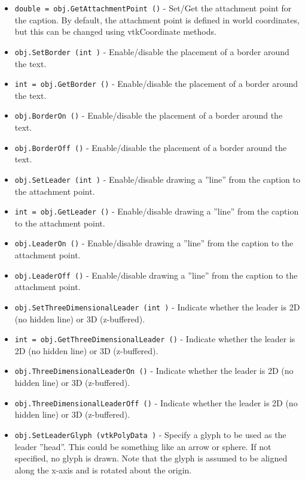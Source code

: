 \begin{itemize}
\item  \verb|double = obj.GetAttachmentPoint ()| -  Set/Get the attachment point for the caption. By default, the attachment
 point is defined in world coordinates, but this can be changed using
 vtkCoordinate methods.

\item  \verb|obj.SetBorder (int )| -  Enable/disable the placement of a border around the text.

\item  \verb|int = obj.GetBorder ()| -  Enable/disable the placement of a border around the text.

\item  \verb|obj.BorderOn ()| -  Enable/disable the placement of a border around the text.

\item  \verb|obj.BorderOff ()| -  Enable/disable the placement of a border around the text.

\item  \verb|obj.SetLeader (int )| -  Enable/disable drawing a ''line'' from the caption to the 
 attachment point.

\item  \verb|int = obj.GetLeader ()| -  Enable/disable drawing a ''line'' from the caption to the 
 attachment point.

\item  \verb|obj.LeaderOn ()| -  Enable/disable drawing a ''line'' from the caption to the 
 attachment point.

\item  \verb|obj.LeaderOff ()| -  Enable/disable drawing a ''line'' from the caption to the 
 attachment point.

\item  \verb|obj.SetThreeDimensionalLeader (int )| -  Indicate whether the leader is 2D (no hidden line) or 3D (z-buffered).

\item  \verb|int = obj.GetThreeDimensionalLeader ()| -  Indicate whether the leader is 2D (no hidden line) or 3D (z-buffered).

\item  \verb|obj.ThreeDimensionalLeaderOn ()| -  Indicate whether the leader is 2D (no hidden line) or 3D (z-buffered).

\item  \verb|obj.ThreeDimensionalLeaderOff ()| -  Indicate whether the leader is 2D (no hidden line) or 3D (z-buffered).

\item  \verb|obj.SetLeaderGlyph (vtkPolyData )| -  Specify a glyph to be used as the leader ''head''. This could be something
 like an arrow or sphere. If not specified, no glyph is drawn. Note that
 the glyph is assumed to be aligned along the x-axis and is rotated about
 the origin.


\end{itemize}
